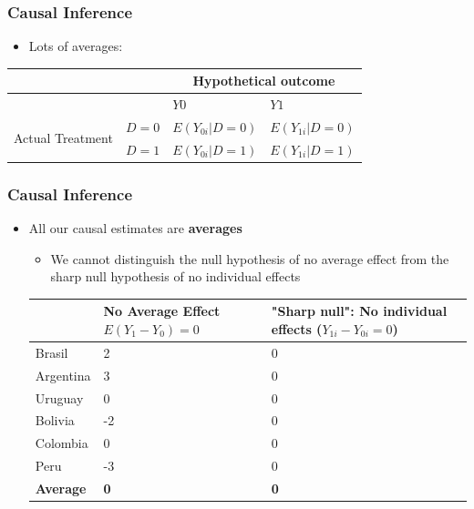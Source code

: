\documentclass[xcolor=x11names,compress]{beamer}\usepackage[]{graphicx}\usepackage[]{color}
\renewcommand{\(}{\begin{columns}}
\renewcommand{\)}{\end{columns}}
\newcommand{\<}[1]{\begin{column}{#1}}
\renewcommand{\>}{\end{column}}
\begin{document}
\begin{frame}
\frametitle{Causal Inference}
\begin{itemize}
\item Lots of averages:
\end{itemize}
\begin{table}[htbp]
  \centering
    \begin{tabular}{|c|l|l|l|}
    \hline
          &       & \multicolumn{2}{c|}{Hypothetical outcome} \bigstrut\\
    \hline
          &       & $Y0$    & $Y1$ \bigstrut\\
    \hline
    \multirow{2}[4]{*}{Actual Treatment} & $D=0$   & \cellcolor{blue!25}$E(Y_{0i}|D=0)$ & $E(Y_{1i}|D=0)$ \bigstrut\\
\cline{2-4}          & $D=1$   & $E(Y_{0i}|D=1)$ & \cellcolor{blue!25}$E(Y_{1i}|D=1)$ \bigstrut\\
    \hline
    \end{tabular}%
  \label{tab:addlabel}%
\end{table}%
\end{frame}

\begin{frame}
\frametitle{Causal Inference}
\begin{itemize}
\item All our causal estimates are \textbf{averages}
\pause
\begin{itemize}
\item We cannot distinguish the null hypothesis of no average effect from the sharp null hypothesis of no individual effects
\pause
\end{itemize}
\footnotesize
\begin{table}[htbp]
  \centering
    \begin{tabular}{|l|p{3cm}|p{3cm}|}
    \hline
          & \multicolumn{1}{p{3cm}|}{No Average Effect $E(Y_1-Y_0)=0$} & \multicolumn{1}{p{3cm}|}{"Sharp null": No individual effects ($Y_{1i}-Y_{0i}=0$)} \bigstrut\\
    \hline
    Brasil & 2     & 0 \bigstrut\\
    \hline
    Argentina & 3    & 0 \bigstrut\\
    \hline
    Uruguay & 0    & 0 \bigstrut\\
    \hline
    Bolivia & -2    & 0 \bigstrut\\
    \hline
    Colombia & 0     & 0 \bigstrut\\
    \hline
    Peru  & -3    & 0 \bigstrut\\
    \hline
    \textbf{Average} & \textbf{0}     & \textbf{0} \bigstrut\\
    \hline
    \end{tabular}%
  \label{tab:addlabel}%
\end{table}%
\normalsize
\end{itemize}
\end{frame}
\end{document}
